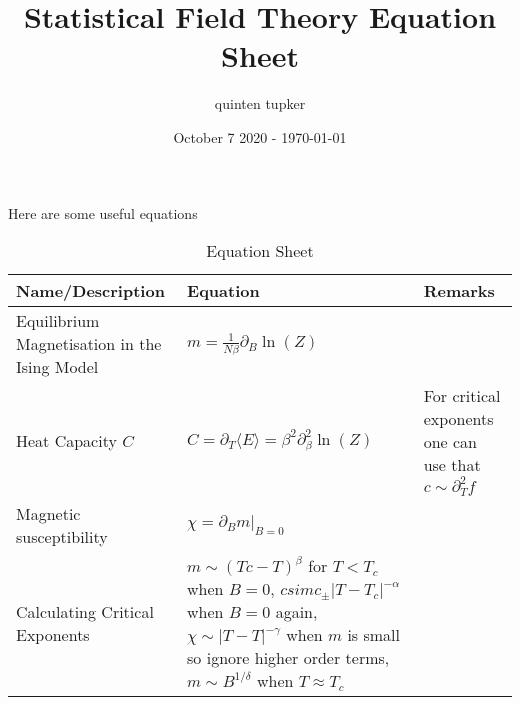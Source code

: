 \documentclass{article}
\title{Statistical Field Theory Equation Sheet}
\author{quinten tupker}
\date{October 7 2020 - \today}
\theoremstyle{definition}
\begin{document}
\maketitle

Here are some useful equations

\begin{table}[H]
  \caption{Equation Sheet}
  \begin{adjustbox}{center}
    \begin{tabular}{|p{5cm}|p{10cm}|p{5cm}|}
      \hline
      \label{equations_1}
      Name/Description & Equation & Remarks \\ \hline
      Equilibrium Magnetisation in the Ising Model & $m = \frac{1}{N \beta} \partial_B \ln(Z)$ & \\ \hline
      Heat Capacity $C$ & $C = \partial_T \langle E \rangle = \beta^2 \partial_\beta^2 \ln(Z)$ & For critical exponents one can use that $c \sim \partial_T^2 f$ \\ \hline
      Magnetic susceptibility & $\chi = \partial_B m |_{B = 0}$ & \\ \hline
      Calculating Critical Exponents & $m \sim (Tc - T)^\beta$ for $T < T_c$ when $B = 0$, $c sim c_\pm |T - T_c|^{-\alpha}$ when $B=0$ again, $\chi \sim |T - T|^{-\gamma}$ when $m$ is small so ignore higher order terms, $m \sim B^{1 / \delta}$ when $T \approx T_c$ & \\ \hline
    \end{tabular}
  \end{adjustbox}
\end{table}
\end{document}
